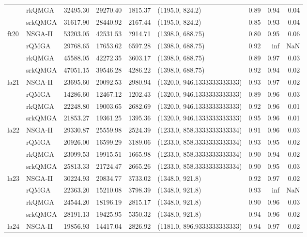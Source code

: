 \begin{tabular}{llrrrlrrr}
 & rkQMGA & 32495.30 & 29270.40 & 1815.37 & (1195.0, 824.2) & 0.89 & 0.94 & 0.04 \\
 & srkQMGA & 31617.90 & 28440.92 & 2167.44 & (1195.0, 824.2) & 0.85 & 0.93 & 0.04 \\
\cline{1-9}
\multirow[t]{4}{*}{ft20} & NSGA-II & 53203.05 & 42531.53 & 7914.71 & (1398.0, 688.75) & 0.80 & 0.95 & 0.06 \\
 & rQMGA & 29768.65 & 17653.62 & 6597.28 & (1398.0, 688.75) & 0.92 & inf & NaN \\
 & rkQMGA & 45588.05 & 42272.35 & 3603.17 & (1398.0, 688.75) & 0.89 & 0.97 & 0.03 \\
 & srkQMGA & 47051.15 & 39546.28 & 4286.22 & (1398.0, 688.75) & 0.92 & 0.94 & 0.02 \\
\cline{1-9}
\multirow[t]{4}{*}{la21} & NSGA-II & 23695.60 & 20092.53 & 2980.94 & (1320.0, 946.1333333333333) & 0.93 & 0.97 & 0.02 \\
 & rQMGA & 14286.60 & 12467.12 & 1202.43 & (1320.0, 946.1333333333333) & 0.89 & 0.96 & 0.03 \\
 & rkQMGA & 22248.80 & 19003.65 & 2682.69 & (1320.0, 946.1333333333333) & 0.92 & 0.96 & 0.01 \\
 & srkQMGA & 21853.27 & 19361.25 & 1395.36 & (1320.0, 946.1333333333333) & 0.95 & 0.96 & 0.01 \\
\cline{1-9}
\multirow[t]{4}{*}{la22} & NSGA-II & 29330.87 & 25559.98 & 2524.39 & (1233.0, 858.3333333333334) & 0.91 & 0.96 & 0.03 \\
 & rQMGA & 20926.00 & 16599.29 & 3189.06 & (1233.0, 858.3333333333334) & 0.93 & 0.95 & 0.02 \\
 & rkQMGA & 23099.53 & 19915.51 & 1665.98 & (1233.0, 858.3333333333334) & 0.90 & 0.94 & 0.02 \\
 & srkQMGA & 25813.33 & 21724.47 & 2665.26 & (1233.0, 858.3333333333334) & 0.90 & 0.95 & 0.03 \\
\cline{1-9}
\multirow[t]{4}{*}{la23} & NSGA-II & 30224.93 & 20834.77 & 3733.02 & (1348.0, 921.8) & 0.92 & 0.97 & 0.02 \\
 & rQMGA & 22363.20 & 15210.08 & 3798.39 & (1348.0, 921.8) & 0.93 & inf & NaN \\
 & rkQMGA & 24544.20 & 18196.19 & 2815.17 & (1348.0, 921.8) & 0.90 & 0.96 & 0.03 \\
 & srkQMGA & 28191.13 & 19425.95 & 5350.32 & (1348.0, 921.8) & 0.94 & 0.96 & 0.02 \\
\cline{1-9}
\multirow[t]{4}{*}{la24} & NSGA-II & 19856.93 & 14417.04 & 2826.92 & (1181.0, 896.9333333333333) & 0.94 & 0.97 & 0.02 \\

\end{tabular}
